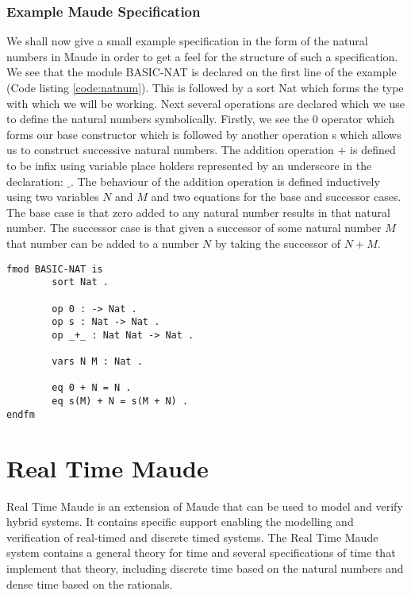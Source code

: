 \subsubsection{Example Maude Specification}
We shall now give a small example specification in the form of the natural numbers in Maude in order to get a feel for the structure of such a specification. We see that the module BASIC-NAT is declared on the first line of the example (Code listing \ref{code:natnum}). This is followed by a sort Nat which forms the type with which we will be working. Next several operations are declared which we use to define the natural numbers symbolically. Firstly, we see the $0$ operator which forms our base constructor which is followed by another operation s which allows us to construct successive natural numbers. The addition operation $+$ is defined to be infix using variable place holders represented by an underscore in the declaration:  $\_$. The behaviour of the addition operation is defined inductively using two variables $N$ and $M$ and two equations for the base and successor cases. The base case is that zero added to any natural number results in that natural number. The successor case is that given a successor of some natural number $M$ that number can be added to a number $N$ by taking the successor of $N+M$.

\begin{lstlisting}[caption = The natural numbers in Maude, label = code:natnum]
fmod BASIC-NAT is
        sort Nat .

        op 0 : -> Nat .
        op s : Nat -> Nat .
        op _+_ : Nat Nat -> Nat .

        vars N M : Nat .

        eq 0 + N = N .
        eq s(M) + N = s(M + N) .
endfm
\end{lstlisting}



\section{Real Time Maude}
Real Time Maude is an extension of Maude that can be used to model and verify hybrid systems. It contains specific support enabling the modelling and verification of real-timed and discrete timed systems. 
The Real Time Maude system contains a general theory for time and several specifications of time that implement that theory, including discrete time based on the natural numbers and dense time based on the rationals.

